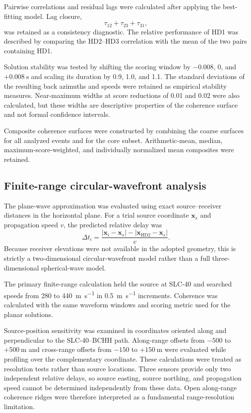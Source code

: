 \documentclass[12pt]{article}
\begin{document}
Pairwise correlations and residual lags were calculated after applying the
best-fitting model. Lag closure,
\begin{equation}
  \tau_{12}+\tau_{23}+\tau_{31},
  \label{eq:lag-closure}
\end{equation}
was retained as a consistency diagnostic. The relative performance of HD1 was
described by comparing the HD2--HD3 correlation with the mean of the two pairs
containing HD1.

Solution stability was tested by shifting the scoring window by
$-0.008$, 0, and $+\SI{0.008}{\second}$ and scaling its duration by 0.9, 1.0,
and 1.1. The standard deviations of the resulting back azimuths and speeds were
retained as empirical stability measures. Near-maximum widths at score
reductions of 0.01 and 0.02 were also calculated, but these widths are
descriptive properties of the coherence surface and not formal confidence
intervals.

Composite coherence surfaces were constructed by combining the coarse surfaces
for all analyzed events and for the core subset. Arithmetic-mean, median,
maximum-score-weighted, and individually normalized mean composites were
retained.

\subsection{Finite-range circular-wavefront analysis}

The plane-wave approximation was evaluated using exact source--receiver
distances in the horizontal plane. For a trial source coordinate $\mathbf{x}_s$
and propagation speed $v$, the predicted relative delay was
\begin{equation}
  \Delta t_i =
  \frac{
    \left|\mathbf{x}_i-\mathbf{x}_s\right|
    -\left|\mathbf{x}_{\mathrm{HD2}}-\mathbf{x}_s\right|
  }{v}.
  \label{eq:circular-delay}
\end{equation}
Because receiver elevations were not available in the adopted geometry, this is
strictly a two-dimensional circular-wavefront model rather than a full
three-dimensional spherical-wave model.

The primary finite-range calculation held the source at SLC-40 and searched
speeds from 280 to \SI{440}{\metre\per\second} in
\SI{0.5}{\metre\per\second} increments. Coherence was calculated with the same
waveform windows and scoring metric used for the planar solutions.

Source-position sensitivity was examined in coordinates oriented along and
perpendicular to the SLC-40--BCHH path. Along-range offsets from $-500$ to
$+\SI{500}{\metre}$ and cross-range offsets from $-150$ to
$+\SI{150}{\metre}$ were evaluated while profiling over the complementary
coordinate. These calculations were treated as resolution tests rather than
source locations. Three sensors provide only two independent relative delays, so
source easting, source northing, and propagation speed cannot be determined
independently from these data. Open along-range coherence ridges were therefore
interpreted as a fundamental range-resolution limitation.
\end{document}
